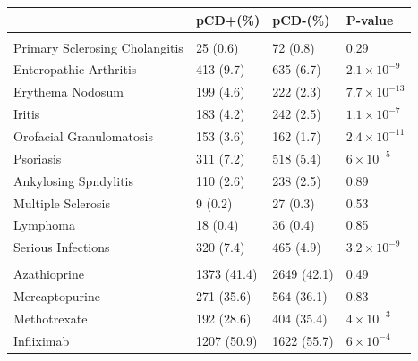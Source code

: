 \begin{table}
  \centering
  \begin{tabular}[t]{llll}
  \toprule
  \textbf{} & \textbf{pCD+(\%)} & \textbf{pCD-(\%)} & \textbf{P-value}\\
  \midrule
  \addlinespace[0.3em]
  \multicolumn{4}{l}{\textbf{Extraintestinal Manifestations}}\\
  \hspace{1em}Primary Sclerosing Cholangitis & 25 (0.6) & 72 (0.8) & 0.29\\
  \hspace{1em}Enteropathic Arthritis & 413 (9.7) & 635 (6.7) & $2.1\times10^{-9}$\\
  \hspace{1em}Erythema Nodosum & 199 (4.6) & 222 (2.3) & $7.7\times10^{-13}$\\
  \hspace{1em}Iritis & 183 (4.2) & 242 (2.5) & $1.1\times10^{-7}$\\
  \hspace{1em}Orofacial Granulomatosis & 153 (3.6) & 162 (1.7) & $2.4\times10^{-11}$\\
  \hspace{1em}Psoriasis & 311 (7.2) & 518 (5.4) & $6\times10^{-5}$\\
  \hspace{1em}Ankylosing Spndylitis & 110 (2.6) & 238 (2.5) & 0.89\\
  \hspace{1em}Multiple Sclerosis & 9 (0.2) & 27 (0.3) & 0.53\\
  \hspace{1em}Lymphoma & 18 (0.4) & 36 (0.4) & 0.85\\
  \hspace{1em}Serious Infections & 320 (7.4) & 465 (4.9) & $3.2\times10^{-9}$\\
  \addlinespace[0.3em]
  \multicolumn{4}{l}{\textbf{Drugs}}\\
  \hspace{1em}Azathioprine & 1373 (41.4) & 2649 (42.1) & 0.49\\
  \hspace{1em}Mercaptopurine & 271 (35.6) & 564 (36.1) & 0.83\\
  \hspace{1em}Methotrexate & 192 (28.6) & 404 (35.4) & ${4\times10^{-3}}$\\
  \hspace{1em}Infliximab & 1207 (50.9) & 1622 (55.7) & $6\times10^{-4}$\\

\end{tabular}
\end{table}
